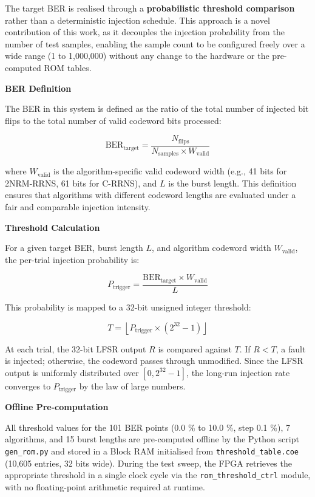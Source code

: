 \documentclass[
  english,
  12pt,
]{report}
\begin{document}
The target BER is realised through a \textbf{probabilistic threshold
comparison} rather than a deterministic injection schedule. This
approach is a novel contribution of this work, as it decouples the
injection probability from the number of test samples, enabling the
sample count to be configured freely over a wide range (1 to 1,000,000)
without any change to the hardware or the pre-computed ROM tables.

\textbf{BER Definition}

The BER in this system is defined as the ratio of the total number of
injected bit flips to the total number of valid codeword bits processed:

\[\text{BER}_{\text{target}} = \frac{N_{\text{flips}}}{N_{\text{samples}} \times W_{\text{valid}}}\]

where \(W_{\text{valid}}\) is the algorithm-specific valid codeword
width (e.g., 41 bits for 2NRM-RRNS, 61 bits for C-RRNS), and \(L\) is
the burst length. This definition ensures that algorithms with different
codeword lengths are evaluated under a fair and comparable injection
intensity.

\textbf{Threshold Calculation}

For a given target BER, burst length \(L\), and algorithm codeword width
\(W_{\text{valid}}\), the per-trial injection probability is:

\[P_{\text{trigger}} = \frac{\text{BER}_{\text{target}} \times W_{\text{valid}}}{L}\]

This probability is mapped to a 32-bit unsigned integer threshold:

\[T = \left\lfloor P_{\text{trigger}} \times (2^{32} - 1) \right\rfloor\]

At each trial, the 32-bit LFSR output \(R\) is compared against \(T\).
If \(R < T\), a fault is injected; otherwise, the codeword passes
through unmodified. Since the LFSR output is uniformly distributed over
\([0, 2^{32}-1]\), the long-run injection rate converges to
\(P_{\text{trigger}}\) by the law of large numbers.

\textbf{Offline Pre-computation}

All threshold values for the 101 BER points (0.0 \% to 10.0 \%, step 0.1
\%), 7 algorithms, and 15 burst lengths are pre-computed offline by the
Python script \texttt{gen\_rom.py} and stored in a Block RAM initialised
from \texttt{threshold\_table.coe} (10,605 entries, 32 bits wide).
During the test sweep, the FPGA retrieves the appropriate threshold in a
single clock cycle via the \texttt{rom\_threshold\_ctrl} module, with no
floating-point arithmetic required at runtime.
\end{document}
